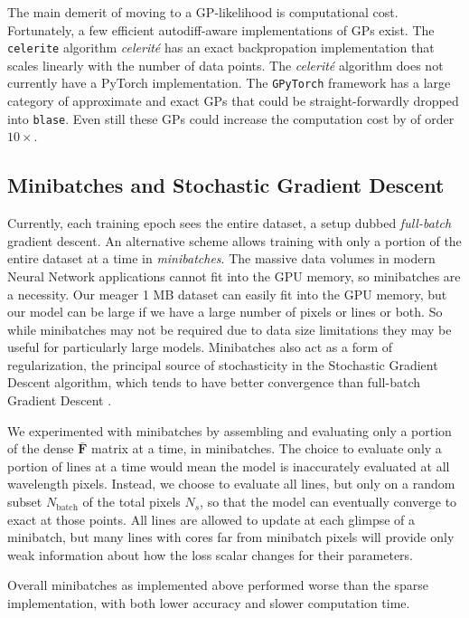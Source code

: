 \documentclass[trackchanges]{aastex631}
\begin{document}
The main demerit of moving to a GP-likelihood is computational cost.  Fortunately, a few efficient autodiff-aware implementations of GPs exist. The \texttt{celerite} algorithm \emph{celerit\'e} \citep{2017AJ....154..220F} has an exact backpropation implementation \citep{2018RNAAS...2...31F} that scales linearly with the number of data points.  The \emph{celerit\'e} algorithm does not currently have a PyTorch implementation.  The \texttt{GPyTorch} framework \citep{2018arXiv180911165G} has a large category of approximate and exact GPs that could be straight-forwardly dropped into \texttt{blase}.  Even still these GPs could increase the computation cost by of order $10\times$.


\subsection{Minibatches and Stochastic Gradient Descent}\label{minibatches}

Currently, each training epoch sees the entire dataset, a setup dubbed \emph{full-batch} gradient descent.
An alternative scheme allows training with only a portion of the entire dataset at a time in \emph{minibatches}.  The massive data volumes in modern Neural Network applications cannot fit into the GPU memory, so minibatches are a necessity.  Our meager 1 MB dataset can easily fit into the GPU memory, but our model can be large if we have a large number of pixels or lines or both.
So while minibatches may not be required due to data size limitations they may be useful for particularly large models.
Minibatches also act as a form of regularization, the principal source of stochasticity in the Stochastic Gradient Descent algorithm, which tends to have better convergence than full-batch Gradient Descent \citep{2016arXiv160904747R}.

We experimented with minibatches by assembling and evaluating only a portion of the dense $\bar{\bm{F}}$ matrix at a time, in minibatches. The choice to evaluate only a portion of lines at a time would mean the model is inaccurately evaluated at all wavelength pixels. Instead, we choose to evaluate all lines, but only on a random subset $N_{\mathrm{batch}}$ of the total pixels $N_s$, so that the model can eventually converge to exact at those points. All lines are allowed to update at each glimpse of a minibatch, but many lines with cores far from minibatch pixels will provide only weak information about how the loss scalar changes for their parameters.

Overall minibatches as implemented above performed worse than the sparse implementation, with both lower accuracy and slower computation time.
\end{document}

